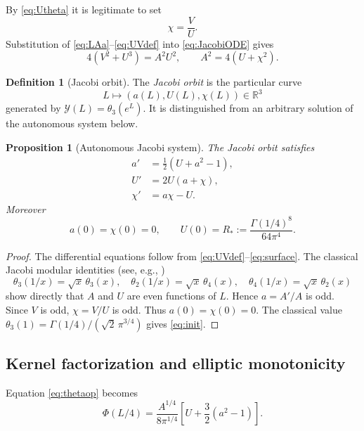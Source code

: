 \documentclass{amsart}
\numberwithin{equation}{section}
\newtheorem{proposition}[theorem]{Proposition}
\theoremstyle{definition}
\newtheorem{definition}[theorem]{Definition}
\theoremstyle{remark}
\newcommand{\Rstar}{R_*}
\begin{document}
By \eqref{eq:Utheta} it is legitimate to set
\begin{equation}\label{eq:chi}
 \chi=\frac VU.
\end{equation}
Substitution of \eqref{eq:LAa}--\eqref{eq:UVdef} into \eqref{eq:JacobiODE} gives
\begin{equation}\label{eq:surface}
 4(V^2+U^3)=A^2U^2,
 \qquad
 A^2=4(U+\chi^2).
\end{equation}

\begin{definition}[Jacobi orbit]
The \emph{Jacobi orbit} is the particular curve
\[
 L\longmapsto(a(L),U(L),\chi(L))\in\mathbb R^3
\]
generated by $\mathscr Y(L)=\theta_3(e^L)$.  It is distinguished from an arbitrary solution of the autonomous system below.
\end{definition}

\begin{proposition}[Autonomous Jacobi system]\label{prop:flow}
The Jacobi orbit satisfies
\begin{equation}\label{eq:flow}
 \boxed{\begin{aligned}
 a'&=\tfrac12(U+a^2-1),\\
 U'&=2U(a+\chi),\\
 \chi'&=a\chi-U.
 \end{aligned}}
\end{equation}
Moreover
\begin{equation}\label{eq:init}
 a(0)=\chi(0)=0,\qquad
 U(0)=\Rstar:=\frac{\Gamma(1/4)^8}{64\pi^4}.
\end{equation}
\end{proposition}
\begin{proof}
The differential equations follow from \eqref{eq:UVdef}--\eqref{eq:surface}.  The classical Jacobi modular identities (see, e.g., \cite{DLMF20,ConwaySloane1999})
\[
 \theta_3(1/x)=\sqrt{x}\,\theta_3(x),\quad
 \theta_2(1/x)=\sqrt{x}\,\theta_4(x),\quad
 \theta_4(1/x)=\sqrt{x}\,\theta_2(x)
\]
show directly that $A$ and $U$ are even functions of $L$.  Hence $a=A'/A$ is odd.  Since $V$ is odd, $\chi=V/U$ is odd.  Thus $a(0)=\chi(0)=0$.  The classical value $\theta_3(1)=\Gamma(1/4)/(\sqrt2\,\pi^{3/4})$ gives \eqref{eq:init}.
\end{proof}

\subsection{Kernel factorization and elliptic monotonicity}
Equation \eqref{eq:thetaop} becomes
\begin{equation}\label{eq:kernelAU}
 \Phi(L/4)=\frac{A^{1/4}}{8\pi^{1/4}}
 \left[U+\frac32(a^2-1)\right].
\end{equation}
\end{document}
